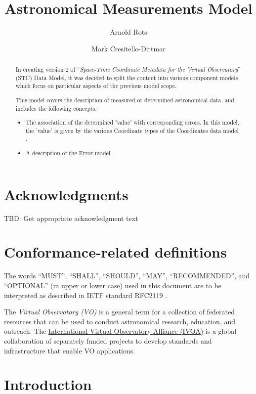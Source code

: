 \documentclass[11pt,a4paper]{ivoa}
\title{Astronomical Measurements Model}
\author{Arnold Rots}
\author{Mark Cresitello-Dittmar}
\begin{document}
\begin{abstract}
  In creating version 2 of ``\emph{Space-Time Coordinate Metadata for the Virtual Observatory}'' (STC) \citep{2007ivoa.spec.1030R} Data Model, it was decided to split the content into various component models which focus on particular aspects of the previous model scope.  
  
  This model covers the description of measured or determined astronomical data, and includes the following concepts:
  \begin{itemize}
  \item The association of the determined 'value' with corresponding errors.  In this model, the 'value' is given by the various Coordinate types of the Coordinates data model \citep{std:Coords}.
  \item A description of the Error model.
  \end{itemize}

\end{abstract}


\section*{Acknowledgments}
TBD: Get appropriate acknowledgment text

\section*{Conformance-related definitions}

The words ``MUST'', ``SHALL'', ``SHOULD'', ``MAY'', ``RECOMMENDED'', and
``OPTIONAL'' (in upper or lower case) used in this document are to be
interpreted as described in IETF standard RFC2119 \citep{std:RFC2119}.

The \emph{Virtual Observatory (VO)} is a
general term for a collection of federated resources that can be used
to conduct astronomical research, education, and outreach.
The \href{http://www.ivoa.net}{International
Virtual Observatory Alliance (IVOA)} is a global
collaboration of separately funded projects to develop standards and
infrastructure that enable VO applications.


\section{Introduction}
\end{document}
